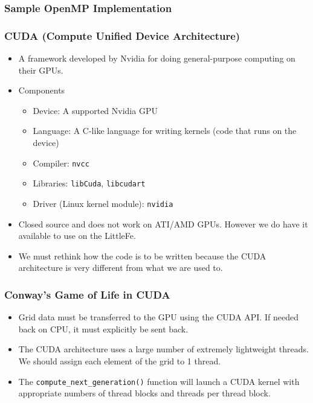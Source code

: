 \documentclass{beamer}
\begin{document}
\begin{frame}[fragile]
	\frametitle{Sample OpenMP Implementation}
	
\end{frame}

\begin{frame}
\frametitle{CUDA (Compute Unified Device Architecture)}
	\begin{itemize}
		\item A framework developed by Nvidia for doing
		general-purpose computing on their GPUs.
		\item Components 
			\begin{itemize}
			\item Device: A supported Nvidia GPU
			\item Language: A C-like language for writing kernels
			(code that runs on the device)
			\item Compiler: {\tt nvcc}
			\item Libraries: {\tt libCuda}, {\tt libcudart}
			\item Driver (Linux kernel module): {\tt nvidia}
			\end{itemize}
		\item Closed source and does not work on ATI/AMD GPUs. However we do
		have it available to use on the LittleFe.
		\item We must rethink how the code is to be written because the CUDA
		architecture is very different from what we are used to.
	\end{itemize}
\end{frame}

\begin{frame}
	\frametitle{Conway's Game of Life in CUDA}
	\begin{itemize}
		\item Grid data must be transferred to the GPU using the CUDA API.
		If needed back on CPU, it must explicitly be sent back.
		\item The CUDA architecture uses a large number of extremely
		lightweight threads.  We should assign each element of the grid to 1
		thread.  
		\item The {\tt compute\_next\_generation()} function will launch a
		CUDA kernel with appropriate numbers of thread blocks and threads
		per thread block.
	\end{itemize}
\end{frame}
\end{document}
